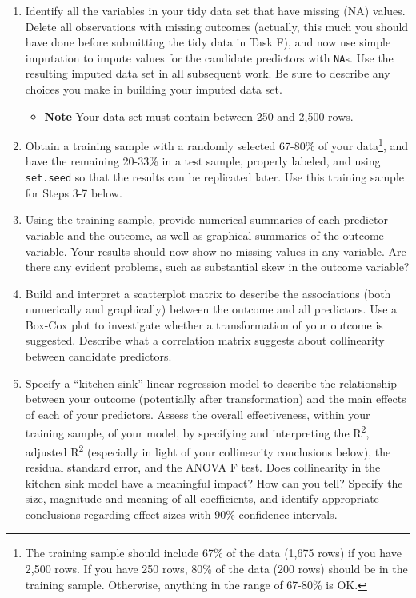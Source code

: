 \documentclass[]{book}
\providecommand{\tightlist}{%
  \setlength{\itemsep}{0pt}\setlength{\parskip}{0pt}}
\let\rmarkdownfootnote\footnote%
\def\footnote{\protect\rmarkdownfootnote}
\begin{document}
\begin{enumerate}
\def\labelenumi{\arabic{enumi}.}
\tightlist
\item
  Identify all the variables in your tidy data set that have missing (NA) values. Delete all observations with missing outcomes (actually, this much you should have done before submitting the tidy data in Task F), and now use simple imputation to impute values for the candidate predictors with \texttt{NA}s. Use the resulting imputed data set in all subsequent work. Be sure to describe any choices you make in building your imputed data set.

  \begin{itemize}
  \tightlist
  \item
    \textbf{Note} Your data set must contain between 250 and 2,500 rows.
  \end{itemize}
\item
  Obtain a training sample with a randomly selected 67-80\% of your data\footnote{The training sample should include 67\% of the data (1,675 rows) if you have 2,500 rows. If you have 250 rows, 80\% of the data (200 rows) should be in the training sample. Otherwise, anything in the range of 67-80\% is OK.}, and have the remaining 20-33\% in a test sample, properly labeled, and using \texttt{set.seed} so that the results can be replicated later. Use this training sample for Steps 3-7 below.
\item
  Using the training sample, provide numerical summaries of each predictor variable and the outcome, as well as graphical summaries of the outcome variable. Your results should now show no missing values in any variable. Are there any evident problems, such as substantial skew in the outcome variable?
\item
  Build and interpret a scatterplot matrix to describe the associations (both numerically and graphically) between the outcome and all predictors. Use a Box-Cox plot to investigate whether a transformation of your outcome is suggested. Describe what a correlation matrix suggests about collinearity between candidate predictors.
\item
  Specify a ``kitchen sink'' linear regression model to describe the relationship between your outcome (potentially after transformation) and the main effects of each of your predictors. Assess the overall effectiveness, within your training sample, of your model, by specifying and interpreting the R\textsuperscript{2}, adjusted R\textsuperscript{2} (especially in light of your collinearity conclusions below), the residual standard error, and the ANOVA F test. Does collinearity in the kitchen sink model have a meaningful impact? How can you tell? Specify the size, magnitude and meaning of all coefficients, and identify appropriate conclusions regarding effect sizes with 90\% confidence intervals.

\end{enumerate}
\end{document}
